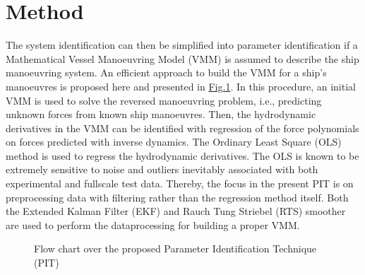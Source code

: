 \documentclass[review]{elsarticle}
\let\sphinxpxdimen\pdfpxdimen\else\newdimen\sphinxpxdimen
\begin{document}
\section{Method}
\label{\detokenize{01.01_method:method}}\label{\detokenize{01.01_method:id1}}\label{\detokenize{01.01_method::doc}}
\sphinxAtStartPar
The system identification can then be simplified into parameter identification if a Mathematical Vessel Manoeuvring Model (VMM) is assumed to describe the ship manoeuvring system. An efficient approach to build the VMM for a ship’s manoeuvres is proposed here and presented in \hyperref[\detokenize{01.01_method:overview}]{Fig.\@ \ref{\detokenize{01.01_method:overview}}}.
In this procedure, an initial VMM is used to solve the reversed manoeuvring problem, i.e., predicting unknown forces from known ship manoeuvres. Then, the hydrodynamic derivatives in the VMM can be identified with regression of the force polynomials on forces predicted with inverse dynamics. The Ordinary Least Square (OLS) method is used to regress the hydrodynamic derivatives. The OLS is known to be extremely sensitive to noise and outliers inevitably associated with both experimental and full\sphinxhyphen{}scale test data. Thereby, the focus in the present PIT is on pre\sphinxhyphen{}processing data with filtering rather than the regression method itself. Both the Extended Kalman Filter (EKF) and Rauch Tung Striebel (RTS) smoother are used to perform the data\sphinxhyphen{}processing for building a proper VMM.

\begin{figure}[H]
\centering
\capstart

\noindent\sphinxincludegraphics[width=500\sphinxpxdimen]{{method}.png}
\caption{Flow chart over the proposed Parameter Identification Technique (PIT)}\label{\detokenize{01.01_method:overview}}\end{figure}
\end{document}
